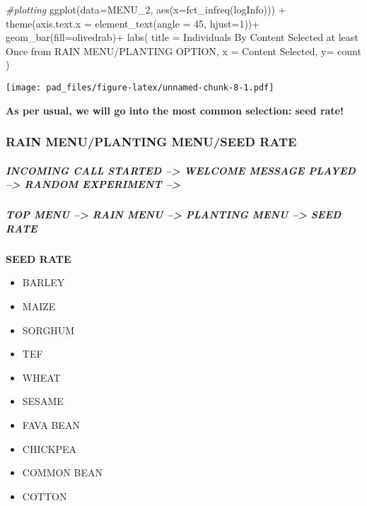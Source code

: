 \documentclass[
]{article}
\newenvironment{Shaded}{\begin{snugshade}}{\end{snugshade}}
\newcommand{\AttributeTok}[1]{\textcolor[rgb]{0.77,0.63,0.00}{#1}}
\newcommand{\CommentTok}[1]{\textcolor[rgb]{0.56,0.35,0.01}{\textit{#1}}}
\newcommand{\DecValTok}[1]{\textcolor[rgb]{0.00,0.00,0.81}{#1}}
\newcommand{\FunctionTok}[1]{\textcolor[rgb]{0.00,0.00,0.00}{#1}}
\newcommand{\NormalTok}[1]{#1}
\newcommand{\SpecialCharTok}[1]{\textcolor[rgb]{0.00,0.00,0.00}{#1}}
\newcommand{\StringTok}[1]{\textcolor[rgb]{0.31,0.60,0.02}{#1}}
\providecommand{\tightlist}{%
  \setlength{\itemsep}{0pt}\setlength{\parskip}{0pt}}
\begin{document}
\begin{Shaded}
\begin{Highlighting}[]
\CommentTok{\#plotting}
\FunctionTok{ggplot}\NormalTok{(}\AttributeTok{data=}\NormalTok{MENU\_2, }\FunctionTok{aes}\NormalTok{(}\AttributeTok{x=}\FunctionTok{fct\_infreq}\NormalTok{(logInfo))) }\SpecialCharTok{+}
  \FunctionTok{theme}\NormalTok{(}\AttributeTok{axis.text.x =} \FunctionTok{element\_text}\NormalTok{(}\AttributeTok{angle =} \DecValTok{45}\NormalTok{, }\AttributeTok{hjust=}\DecValTok{1}\NormalTok{))}\SpecialCharTok{+}
  \FunctionTok{geom\_bar}\NormalTok{(}\AttributeTok{fill=}\StringTok{\textquotesingle{}olivedrab\textquotesingle{}}\NormalTok{)}\SpecialCharTok{+}
  \FunctionTok{labs}\NormalTok{(}
    \AttributeTok{title =} \StringTok{\textquotesingle{}Individuals By Content Selected at least Once from }
\StringTok{    RAIN MENU/PLANTING OPTION\textquotesingle{}}\NormalTok{,}
    \AttributeTok{x =} \StringTok{\textquotesingle{}Content Selected\textquotesingle{}}\NormalTok{,}
    \AttributeTok{y=} \StringTok{\textquotesingle{}count\textquotesingle{}}
\NormalTok{  )}
\end{Highlighting}
\end{Shaded}

\texttt{[image: pad\_files/figure-latex/unnamed-chunk-8-1.pdf]}

\textbf{As per usual, we will go into the most common selection: seed
rate!}

\hypertarget{rain-menuplanting-menuseed-rate}{%
\subsubsection{RAIN MENU/PLANTING MENU/SEED
RATE}\label{rain-menuplanting-menuseed-rate}}

\hypertarget{incoming-call-started-welcome-message-played-random-experiment-4}{%
\subparagraph{INCOMING CALL STARTED --\textgreater{} WELCOME MESSAGE
PLAYED --\textgreater{} RANDOM EXPERIMENT
--\textgreater{}}\label{incoming-call-started-welcome-message-played-random-experiment-4}}

\hypertarget{top-menu-rain-menu-planting-menu-seed-rate}{%
\subparagraph{TOP MENU --\textgreater{} RAIN MENU --\textgreater{}
PLANTING MENU --\textgreater{} SEED
RATE}\label{top-menu-rain-menu-planting-menu-seed-rate}}

\textbf{SEED RATE}

\begin{itemize}
\tightlist
\item
  BARLEY
\item
  MAIZE
\item
  SORGHUM
\item
  TEF
\item
  WHEAT
\item
  SESAME
\item
  FAVA BEAN
\item
  CHICKPEA
\item
  COMMON BEAN
\item
  COTTON
\end{itemize}
\end{document}
